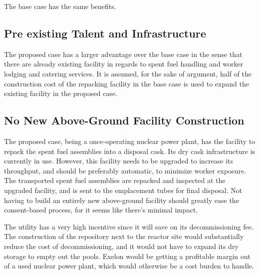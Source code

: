 The base case has the same benefits.



\subsection{Pre existing Talent and Infrastructure }

%

The proposed case has a larger advantage over the base case in the sense that there
are already existing facility in regards to spent fuel handling and worker lodging 
and catering services. 
It is assumed, for the sake of argument, half of the construction cost of the
repacking facility in the base case is used to expand the existing facility in the
proposed case. 

\subsection{No New Above-Ground Facility Construction}



The proposed case, being a once-operating nuclear power plant, has the facility to 
repack the spent fuel assemblies into a disposal cask. Its dry cask infrastructure 
is currently in use. However, this facility needs to be upgraded to increase its throughput, and should be preferably automatic, to minimize worker exposure. The transported spent fuel assemblies are repacked and inspected at the upgraded facility, and is sent to the emplacement tubes for final disposal. Not having to build an entirely new above-ground facility should greatly ease the consent-based process, for it seems like there's minimal impact. 
 
The utility has a very high incentive since it will save on its decommissioning fee.
The construction of the repository next to the reactor site would substantially
reduce the cost of decommissioning, and it would not have to expand its dry storage
to empty out the pools. Exelon would be getting a profitable margin out of a
used nuclear power plant, which would otherwise be a cost burden to handle.


